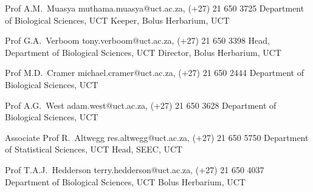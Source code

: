 \documentclass[10pt]{article}
\begin{document}
\begin{hangparas}{2em}{1}

Prof A.M.~Muasya       \hfill muthama.muasya@uct.ac.za, (+27) 21 650 3725 \break
Department of Biological Sciences, UCT                                    \break
Keeper, Bolus Herbarium, UCT

Prof G.A.~Verboom        \hfill tony.verboom@uct.ac.za, (+27) 21 650 3398 \break
Head, Department of Biological Sciences, UCT                              \break
Director, Bolus Herbarium, UCT

Prof M.D.~Cramer       \hfill michael.cramer@uct.ac.za, (+27) 21 650 2444 \break
Department of Biological Sciences, UCT

Prof A.G.~West              \hfill adam.west@uct.ac.za, (+27) 21 650 3628 \break
Department of Biological Sciences, UCT

Associate Prof R.~Altwegg \hfill res.altwegg@uct.ac.za, (+27) 21 650 5750 \break
Department of Statistical Sciences, UCT                                   \break
Head, SEEC, UCT

Prof T.A.J.~Hedderson \hfill terry.hedderson@uct.ac.za, (+27) 21 650 4037 \break
Department of Biological Sciences, UCT                                    \break
Bolus Herbarium, UCT

\hfill

\end{hangparas}
\end{document}
